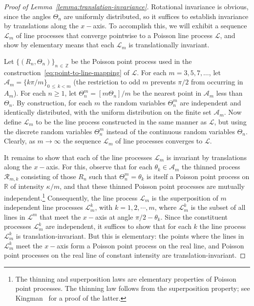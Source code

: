 \documentclass[10pt]{amsart}
\theoremstyle{definition}\newtheorem{defi}[theo]{Definition}\newtheorem{rema}[theo]{Remark}\newtheorem{exam}[theo]{Example}\newtheorem{exem}[theo]{Example}\newtheorem{nota}[theo]{Notation}
\newcommand{\zz}[1]{\mathbb #1}
\begin{document}
\begin{proof}[Proof of Lemma~\ref{lemma:translation-invariance}]
Rotational invariance is obvious, since the angles $\Theta_{n}$ are uniformly distributed, so it suffices to establish invariance by translations along the $x-$axis. To accomplish this, we will exhibit a sequence $\mathcal{L}_{m}$ of line processes that converge pointwise to a Poisson line process $\mathcal{L}$, and show by elementary means that each $\mathcal{L}_{m}$ is translationally invariant.

Let $\{(R_{n},\Theta_{n}) \}_{n\,\in\,\zz{Z}}$  be the Poisson point process used in the construction~\eqref{eq:point-to-line-mapping} of $\mathcal{L}$. For each $m=3,5,7,\dotsc$, let $\mathcal{A}_{m}=\{k\pi / m \}_{0\,\leq\,k<m}$ (the restriction to odd $m$ prevents $\pi /2$ from occurring in $A_{m}$). For each $n\geq 1$, let $\Theta^{m}_{n}=[m\Theta_{n}]/m$ be the nearest point in $\mathcal{A}_{m}$ less than $\Theta_{n}$. By construction, for each $m$ the random variables $\Theta^{m}_{n}$ are independent and identically distributed, with the uniform distribution on the finite set $\mathcal{A}_{m}$. Now define $\mathcal{L}_{m}$ to be the line process constructed in the same manner as $\mathcal{L}$, but using the discrete random variables $\Theta^{m}_{n}$ instead of the continuous random variables $\Theta_{n}$. Clearly, as $m \rightarrow \infty$ the sequence $\mathcal{L}_{m}$ of line processes converges to $\mathcal{L}$.

It remains to show that each of the line processes $\mathcal{L}_{m}$ is invariant by translations along the $x-$axis. For this, observe that for each $\theta_{k}\in \mathcal{A}_{m}$ the thinned process $\mathcal{R}_{m,k}$ consisting of those $R_{n}$ such that $\Theta^{m}_{n}=\theta_{k}$ is itself a Poisson point process on $\zz{R}$ of intensity $\kappa /m$, and that these thinned Poisson point processes are mutually independent.\footnote{The thinning and superposition laws are elementary properties of Poisson point processes. The thinning law follows from the superposition property; see Kingman~\cite{kingman} for a proof of the latter.} Consequently, the line process $\mathcal{L}_{m}$ is the superposition of $m$ independent line processes $\mathcal{L}^{k}_{m}$, with $k=1,2, \cdots,m$, where $\mathcal{L}^{k}_{m}$ is the subset of all lines in $\mathcal{L}^{m}$ that meet the $x-$axis at angle $\pi /2-\theta_{k}.$ Since the constituent processes $\mathcal{L}^{k}_{m}$ are independent, it suffices to show that for each $k$ the line process $\mathcal{L}^{k}_{m}$ is translation-invariant. But this is elementary: the points where the lines in $\mathcal{L}^{k}_{m}$ meet the $x-$axis form a Poisson point process on the real line, and Poisson point processes on the real line of constant intensity are translation-invariant.
\end{proof}
\end{document}
